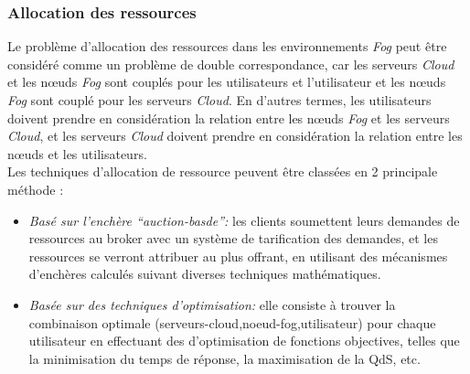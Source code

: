 \subsubsection{Allocation des ressources}
Le problème d'allocation des ressources dans les environnements \emph{Fog} peut être considéré comme un problème de double correspondance, car les serveurs \emph{Cloud} et les nœuds \emph{Fog} sont couplés pour les utilisateurs et l'utilisateur et les nœuds \emph{Fog} sont couplé pour les serveurs \emph{Cloud}. En d'autres termes, les utilisateurs doivent prendre en considération la relation entre les nœuds \emph{Fog} et les serveurs \emph{Cloud}, et les serveurs \emph{Cloud} doivent prendre en considération la relation entre les nœuds et les utilisateurs.\\ 
Les techniques d'allocation de ressource peuvent être classées en 2 principale méthode :
\begin{itemize}
  \item \emph{Basé sur l'enchère “auction-basde”:} les clients soumettent leurs demandes de ressources au broker avec un système de tarification des demandes, et les ressources se verront attribuer au plus offrant, en utilisant des mécanismes d'enchères calculés suivant diverses techniques mathématiques.
  \item \emph{Basée sur des techniques d'optimisation:} elle consiste à trouver la combinaison optimale (serveurs-cloud,noeud-fog,utilisateur) pour chaque utilisateur en effectuant des d'optimisation de fonctions objectives, telles que la minimisation du temps de réponse, la maximisation de la QdS, etc.
\end{itemize}
